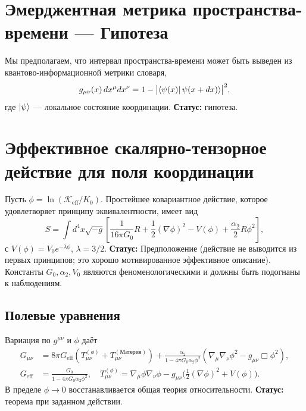 \documentclass[11pt,a4paper]{article}
\begin{document}
	\section{Эмерджентная метрика пространства-времени — Гипотеза}
	\label{sec:metric}
	Мы предполагаем, что интервал пространства-времени может быть выведен из квантово-информационной метрики словаря,
	\[
	g_{\mu\nu}(x) \, dx^\mu dx^\nu = 1 - \bigl| \bra{\psi(x)} \psi(x+dx) \rangle \bigr|^2,
	\]
	где \(\ket{\psi}\) — локальное состояние координации. \textbf{Статус:} гипотеза.
	
	\section{Эффективное скалярно-тензорное действие для поля координации}
	\label{sec:action}
	Пусть \(\phi = \ln(\mathcal{K}_{\mathrm{eff}}/K_0)\). Простейшее ковариантное действие, которое удовлетворяет принципу эквивалентности, имеет вид
	\begin{equation}
		S = \int d^4x\sqrt{-g}\left[ \frac{1}{16\pi G_0} R + \frac12(\nabla\phi)^2 - V(\phi) + \frac{\alpha_2}{2}R\phi^2 \right],
		\label{eq:action}
	\end{equation}
	с \(V(\phi) = V_0 e^{-\lambda\phi}\), \(\lambda = 3/2\). \textbf{Статус:} Предположение (действие не выводится из первых принципов; это хорошо мотивированное эффективное описание). Константы \(G_0, \alpha_2, V_0\) являются феноменологическими и должны быть подогнаны к наблюдениям.
	
	\subsection{Полевые уравнения}
	Вариация по \(g^{\mu\nu}\) и \(\phi\) даёт
	\begin{align}
		G_{\mu\nu} &= 8\pi G_{\mathrm{eff}}\left(T_{\mu\nu}^{(\phi)} + T_{\mu\nu}^{(\text{Материя})}\right) + \frac{\alpha_2}{1-4\pi G_0\alpha_2\phi^2}\left(\nabla_\mu\nabla_\nu\phi^2 - g_{\mu\nu}\Box\phi^2\right), \label{eq:einstein-mod} \\
		G_{\mathrm{eff}} &= \frac{G_0}{1-4\pi G_0\alpha_2\phi^2},\quad
		T_{\mu\nu}^{(\phi)} = \nabla_\mu\phi\nabla_\nu\phi - g_{\mu\nu}\bigl(\tfrac12(\nabla\phi)^2 + V(\phi)\bigr).
	\end{align}
	В пределе \(\phi\to0\) восстанавливается общая теория относительности. \textbf{Статус:} теорема при заданном действии.
	
\end{document}
